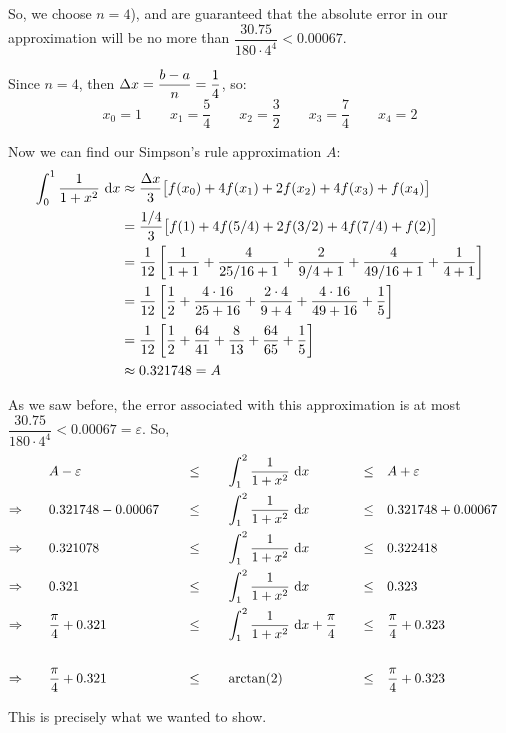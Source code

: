 \begin{solution}
 So, we choose $n=4$), and are guaranteed that the absolute error in our approximation will be no more than $\dfrac{30.75}{180\cdot 4^4} < 0.00067$.

Since $n=4$, then $\Delta x = \dfrac{b-a}{n}=\dfrac{1}{4}$, so:
\[x_0 = 1 \qquad x_1=\frac{5}{4} \qquad x_2 = \frac{3}{2} \qquad x_3 = \frac{7}{4} \qquad x_4=2\]

Now we can find our Simpson's rule approximation $A$:
\begin{align*}
\int_0^1 \frac{1}{1+x^2}~\mathrm{d}x&\approx \frac{\Delta x}{3}\big[
f(x_0) + 4f(x_1)+2f(x_2)+4f(x_3)+f(x_4)
\big]\\
&=\frac{1/4}{3}\big[
f(1) + 4f(5/4)+2f(3/2)+4f(7/4)+f(2)
\big]\\
&=\frac{1}{12}\left[
\frac{1}{1+1} + \frac{4}{25/16+1}+\frac{2}{9/4+1}+\frac{4}{49/16+1}+\frac{1}{4+1}
\right]\\
&=\frac{1}{12}\left[
\frac{1}{2} + \frac{4\cdot 16}{25+16}+\frac{2\cdot 4}{9+4}+\frac{4\cdot 16}{49+16}+\frac{1}{5}
\right]\\
&=\frac{1}{12}\left[
\frac{1}{2} + \frac{64}{41}+\frac{8}{13}+\frac{64}{65}+\frac{1}{5}
\right]\\
&\approx 0.321748=A
\end{align*}

As we saw before, the error associated with this approximation is at most $ \dfrac{30.75}{180\cdot 4^4} < 0.00067=\varepsilon$. So,
\begin{alignat*}{5}
&A-\varepsilon \quad&&\leq\quad && \int_1^2\frac{1}{1+x^2}~\mathrm{d}x   &\leq \quad &A+\varepsilon&\\
\Rightarrow\qquad&0.321748 - 0.00067 \quad&&\leq\quad && \int_1^2\frac{1}{1+x^2}~\mathrm{d}x  \quad &\leq \quad &0.321748 + 0.00067&\\
\Rightarrow\qquad&0.321078 &&\leq\quad & &\int_1^2\frac{1}{1+x^2}~\mathrm{d}x\quad   &\leq \quad &0.322418&\\
\Rightarrow\qquad&0.321 &&\leq\quad  &&\int_1^2\frac{1}{1+x^2}~\mathrm{d}x\quad   &\leq \quad &0.323&
\\\Rightarrow\qquad&\frac{\pi}{4}+0.321 && \leq\quad  &&\int_1^2\frac{1}{1+x^2}~\mathrm{d}x+\frac{\pi}{4}\quad   &\leq \quad &\frac{\pi}{4}+0.323&
\\\\\Rightarrow\qquad&\frac{\pi}{4}+0.321 && \leq\quad &&\arctan(2)   &\leq \quad &\frac{\pi}{4}+0.323&
\end{alignat*}

This is precisely what we wanted to show.
\end{solution}
